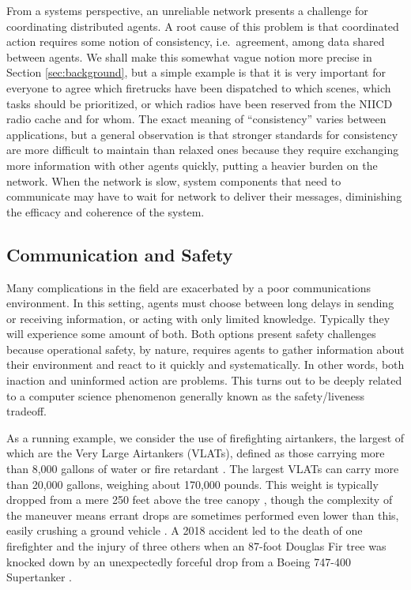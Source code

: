 \documentclass[]             %
{NASA}                       %
\theoremstyle{definition}
\begin{document}
From a systems perspective, an unreliable network presents a challenge
for coordinating distributed agents. A root cause of this problem is
that coordinated action requires some notion of consistency,
i.e.~agreement, among data shared between agents. We shall make this
somewhat vague notion more precise in Section \ref{sec:background},
but a simple example is that it is very important for everyone to
agree which firetrucks have been dispatched to which scenes, which
tasks should be prioritized, or which radios have been reserved from
the {\mbox{NIICD}} radio cache \cite{radiocache} and for whom. The
exact meaning of ``consistency'' varies between applications, but a
general observation is that stronger standards for consistency are
more difficult to maintain than relaxed ones because they require
exchanging more information with other agents quickly, putting a
heavier burden on the network. When the network is slow, system
components that need to communicate may have to wait for network to
deliver their messages, diminishing the efficacy and coherence of the
system.

\subsection{Communication and Safety}
\label{communication-and-safety}

Many complications in the field are exacerbated by a poor
communications environment. In this setting, agents must choose
between long delays in sending or receiving information, or acting
with only limited knowledge. Typically they will experience some
amount of both. Both options present safety challenges because
operational safety, by nature, requires agents to gather information
about their environment and react to it quickly and systematically. In
other words, both inaction and uninformed action are problems. This
turns out to be deeply related to a computer science phenomenon
generally known as the safety/liveness tradeoff.

As a running example, we consider the use of firefighting airtankers,
the largest of which are the Very Large Airtankers (VLATs), defined as
those carrying more than 8,000 gallons of water or fire retardant
\cite{2019:airtankerops}. The largest VLATs can carry more than 20,000
gallons, weighing about 170,000 pounds. This weight is typically
dropped from a mere 250 feet above the tree canopy
\cite{2019:airtankerops}, though the complexity of the maneuver means
errant drops are sometimes performed even lower than this, easily
crushing a ground vehicle \cite{2019:stickney}. A 2018 accident led to
the death of one firefighter and the injury of three others when an
87-foot Douglas Fir tree was knocked down by an unexpectedly forceful
drop from a Boeing 747-400 Supertanker \cite{2018:calfire}.
\end{document}
